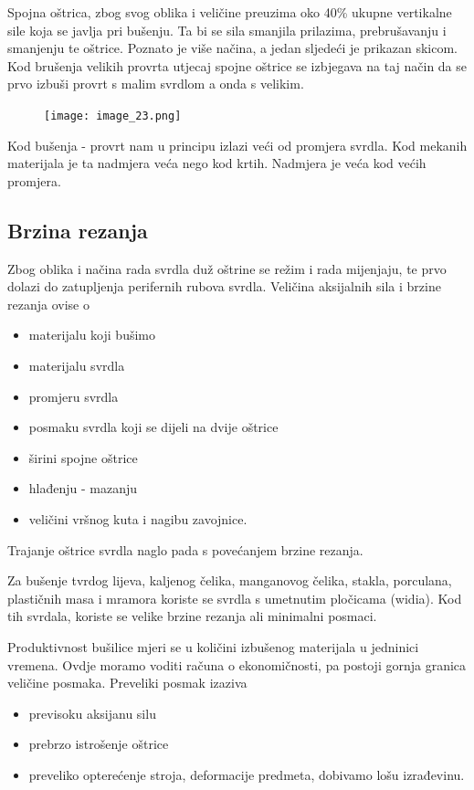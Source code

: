 \documentclass[a4paper,12pt]{article}
\numberwithin{figure}{section}
\begin{document}
Spojna oštrica, zbog svog oblika i veličine preuzima oko 40\% ukupne vertikalne sile koja se javlja pri bušenju. Ta bi se sila smanjila prilazima, prebrušavanju i smanjenju te oštrice. Poznato je više načina, a jedan sljedeći je prikazan skicom.
Kod brušenja velikih provrta utjecaj spojne oštrice se izbjegava na taj način da se prvo izbuši provrt s malim svrdlom a onda s velikim.
\begin{figure}[!h]
\centering
\texttt{[image: image\_23.png]}
\end{figure}
\FloatBarrier
Kod bušenja - provrt nam u principu izlazi veći od promjera svrdla. Kod mekanih materijala je ta nadmjera veća nego kod krtih. Nadmjera je veća kod većih promjera.
\subsection{Brzina rezanja}
Zbog oblika i načina rada svrdla duž oštrine se režim i rada mijenjaju, te prvo dolazi do zatupljenja perifernih rubova svrdla. Veličina aksijalnih sila i brzine rezanja ovise o 
\begin{itemize}
\item materijalu koji bušimo
\item materijalu svrdla
\item promjeru svrdla
\item posmaku svrdla koji se dijeli na dvije oštrice
\item širini spojne oštrice 
\item hlađenju - mazanju
\item veličini vršnog kuta i nagibu zavojnice.
\end{itemize}
Trajanje oštrice svrdla naglo pada s povećanjem brzine rezanja.\par
Za bušenje tvrdog lijeva, kaljenog čelika, manganovog čelika, stakla, porculana, plastičnih masa i mramora koriste se svrdla s umetnutim pločicama (widia). Kod tih svrdala, koriste se velike brzine rezanja ali minimalni posmaci.\par
Produktivnost bušilice mjeri se u količini izbušenog materijala u jedninici vremena. Ovdje moramo voditi računa o ekonomičnosti, pa postoji gornja granica veličine posmaka. Preveliki posmak izaziva
\begin{itemize}
\item previsoku aksijanu silu
\item prebrzo istrošenje oštrice
\item preveliko opterećenje stroja, deformacije predmeta, dobivamo lošu izrađevinu.
\end{itemize}
\end{document}
